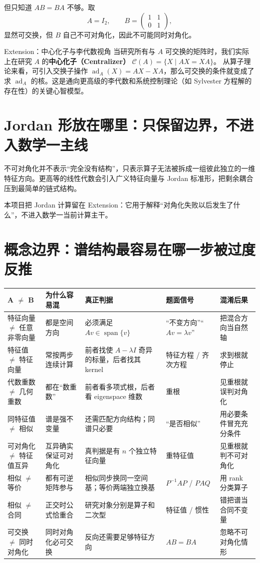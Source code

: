 \documentclass[11pt,a4paper]{ctexart}
\newcommand{\kw}[1]{\textbf{\color{deep}#1}}
\begin{document}
但只知道 $AB=BA$ 不够。取
\[
A=I_2,
\qquad
B=\begin{pmatrix}1&1\\0&1\end{pmatrix},
\]
显然可交换，但 $B$ 自己不可对角化，因此不可能同时对角化。

\begin{corebox}{Extension：中心化子与李代数视角}
当研究所有与 $A$ 可交换的矩阵时，我们实际上在研究 $A$ 的\kw{中心化子（Centralizer）} $\mathcal{C}(A) = \{X \mid AX = XA\}$。
从算子理论来看，可引入交换子操作 $\operatorname{ad}_A(X) = AX - XA$，那么可交换的条件就变成了求 $\operatorname{ad}_A$ 的核。这是通向更高级的李代数和系统控制理论（如 Sylvester 方程解的存在性）的关键心智模型。
\end{corebox}

\section{Jordan 形放在哪里：只保留边界，不进入数学一主线}

不可对角化并不表示“完全没有结构”，只表示算子无法被拆成一组彼此独立的一维特征方向。更高等的线性代数会引入广义特征向量与 Jordan 标准形，把剩余耦合压到最简单的链式结构。

本项目把 Jordan 计算留在 Extension：它用于解释“对角化失败以后发生了什么”，不进入数学一当前计算主干。

\section{概念边界：谱结构最容易在哪一步被过度反推}

\begin{longtable}{L{2.5cm}L{3.0cm}L{3.8cm}L{3.2cm}L{\dimexpr\linewidth-13.1cm\relax}}
\toprule
\textbf{A $\neq$ B} & \textbf{为什么容易混} & \textbf{真正判据} & \textbf{题面信号} & \textbf{混淆后果}\\
\midrule
特征向量 $\neq$ 任意非零向量 & 都是空间方向 & 必须满足 $Av\in\operatorname{span}\{v\}$ & “不变方向”“$Av=\lambda v$” & 把混合方向当自然轴\\
特征值 $\neq$ 特征向量 & 常按两步连续计算 & 前者找使 $A-\lambda I$ 奇异的标量，后者找其 kernel & 特征方程 / 齐次方程 & 求到根就停止\\
代数重数 $\neq$ 几何重数 & 都在“数重数” & 前者看多项式根，后者看 eigenspace 维数 & 重根 & 见重根就误判对角化\\
同特征值 $\neq$ 相似 & 谱是强不变量 & 还需匹配方向结构；同谱只必要 & “是否相似” & 用必要条件冒充充分条件\\
可对角化 $\neq$ 特征值互异 & 互异确实保证可对角化 & 真判据是有 $n$ 个独立特征向量 & 重特征值 & 见重根就判不可对角化\\
相似 $\neq$ 等价 & 都有可逆矩阵参与 & 相似同步换同一空间基；等价两端独立换基 & $P^{-1}AP$ / $PAQ$ & 用 rank 分类算子\\
相似 $\neq$ 合同 & 正交时公式恰重合 & 研究对象分别是算子和二次型 & 特征值 / 惯性 & 错把谱当合同不变量\\
可交换 $\neq$ 同时对角化 & 同时对角化必可交换 & 反向还需要足够特征方向 & $AB=BA$ & 忽略不可对角化情形\\
\bottomrule
\end{longtable}
\end{document}

